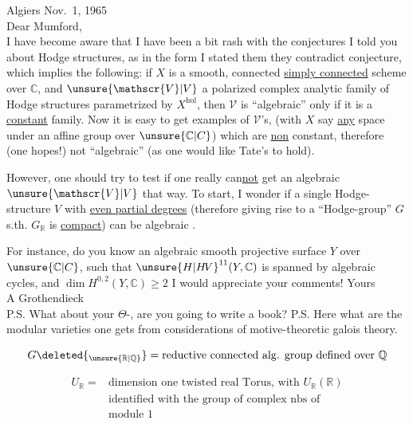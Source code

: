 Algiers Nov.~1, 1965\\
Dear Mumford,\\

I have become aware that I have been a bit rash with the conjectures I told you about Hodge structures, as in the form I stated them they contradict  conjecture, which implies the following: if $X$ is a smooth, connected \uline{simply connected} scheme over $\mathbb{C}$, and $\unsure{\mathscr{V}|V}$ a polarized complex analytic family of Hodge structures parametrized by $X^{\mathrm{hol}}$, then $\mathscr{V}$ is ``algebraic'' only if it is a \uline{constant} family. Now it is easy to get examples of $\mathscr{V}$'s, (with $X$ say \uline{any}  space under an affine group over $\unsure{\mathbb{C}|C}$)
which are \uline{non} constant, therefore (one hopes!) not ``algebraic'' (as one would like Tate's  to hold).

However, one should try to test if one really can\uline{not} get an algebraic $\unsure{\mathscr{V}|V}$ that way. To start, I wonder if a single Hodge-structure $V$ with \uline{even partial degrees} (therefore giving rise to a ``Hodge-group'' $G$ s.th. $G_{\mathbb{R}}$ is \uline{compact}) can be algebraic .

For instance, do you know an algebraic smooth projective surface $Y$ over $\unsure{\mathbb{C}|C}$, such that ${\unsure{H|H\!V}}^{11}(Y,\mathbb{C})$ is spanned by algebraic cycles, and $\dim H^{0,2}(Y,\mathbb{C})\geq 2$  I would appreciate your comments! \quad Yours\\
A Grothendieck\\

P.S. What about your $\Theta$-, are you going to write a book?
P.S. Here what are the modular varieties one gets from considerations of motive-theoretic galois theory.

\[
G\deleted{_{\unsure{\mathbb{R}|\mathbb{Q}}}}
= \text{reductive connected alg. group defined over }\mathbb{Q}
\]

\[
\begin{aligned}
U_{\mathbb{R}}={}&\text{dimension one twisted real Torus, with }U_{\mathbb{R}}(\mathbb{R})\\
&\text{identified with the group of complex nbs of}\\
&\text{module }1
\end{aligned}
\]

